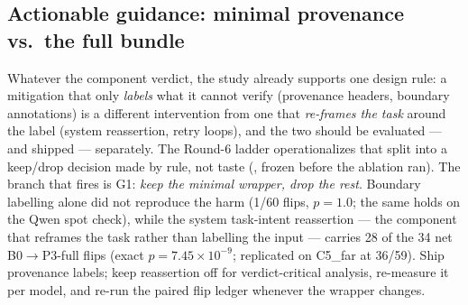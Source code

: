 \subsection{Actionable guidance: minimal provenance vs.\ the full bundle}
\label{sec:guidance}
Whatever the component verdict, the study already supports one design rule:
a mitigation that only \emph{labels} what it cannot verify (provenance
headers, boundary annotations) is a different intervention from one that
\emph{re-frames the task} around the label (system reassertion, retry
loops), and the two should be evaluated --- and shipped --- separately. The
Round-6 ladder operationalizes that split into a keep/drop decision made by
rule, not taste (, frozen before
the ablation ran). The branch that fires is G1: \emph{keep the minimal
wrapper, drop the rest}. Boundary labelling alone did not reproduce the harm (1/60 flips, $p=1.0$; the same holds on the Qwen spot check), while the system task-intent reassertion --- the component that reframes the task rather than labelling the input --- carries 28 of the 34 net B0$\to$P3-full flips (exact $p=7.45{\times}10^{-9}$; replicated on C5\_far at 36/59). Ship provenance labels; keep reassertion off for verdict-critical analysis, re-measure it per model, and re-run the paired flip ledger whenever the wrapper changes.

